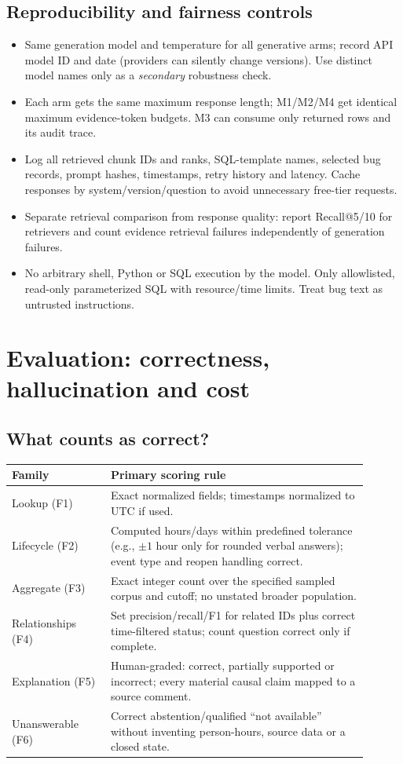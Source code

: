 \documentclass[11pt,a4paper]{article}
\begin{document}
\subsection{Reproducibility and fairness controls}
\begin{itemize}
\item Same generation model and temperature for all generative arms; record API model ID and date (providers can silently change versions). Use distinct model names only as a \emph{secondary} robustness check.
\item Each arm gets the same maximum response length; M1/M2/M4 get identical maximum evidence-token budgets. M3 can consume only returned rows and its audit trace.
\item Log all retrieved chunk IDs and ranks, SQL-template names, selected bug records, prompt hashes, timestamps, retry history and latency. Cache responses by system/version/question to avoid unnecessary free-tier requests.
\item Separate retrieval comparison from response quality: report Recall@5/10 for retrievers and count evidence retrieval failures independently of generation failures.
\item No arbitrary shell, Python or SQL execution by the model. Only allowlisted, read-only parameterized SQL with resource/time limits. Treat bug text as untrusted instructions.
\end{itemize}

\section{Evaluation: correctness, hallucination and cost}
\subsection{What counts as correct?}
\begin{longtable}{@{}p{0.25\linewidth}p{0.65\linewidth}@{}}\toprule
\textbf{Family}&\textbf{Primary scoring rule}\\\midrule\endhead
Lookup (F1)&Exact normalized fields; timestamps normalized to UTC if used.\\
Lifecycle (F2)&Computed hours/days within predefined tolerance (e.g., $\pm 1$ hour only for rounded verbal answers); event type and reopen handling correct.\\
Aggregate (F3)&Exact integer count over the specified sampled corpus and cutoff; no unstated broader population.\\
Relationships (F4)&Set precision/recall/F1 for related IDs plus correct time-filtered status; count question correct only if complete.\\
Explanation (F5)&Human-graded: correct, partially supported or incorrect; every material causal claim mapped to a source comment.\\
Unanswerable (F6)&Correct abstention/qualified ``not available'' without inventing person-hours, source data or a closed state.\\\bottomrule
\end{longtable}
\end{document}
